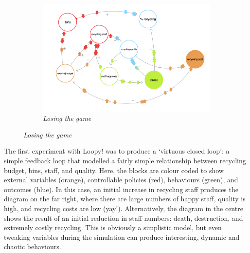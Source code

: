 \documentclass[nofonts,nols,justified,nobib]{tufte-book}
\begin{document}
\begin{figure}
\begin{subfigure}{.3\textwidth}
  \centering
  \includegraphics[width=1\linewidth]{img/3/loopy/small-lose.png}
  \caption{\textit{Losing the game}}
  \label{small:lose}
\end{subfigure}%
\end{figure}
\vspace{0.8cm}

The first experiment with Loopy! was to produce a `virtuous closed loop': a simple feedback loop that modelled a fairly simple relationship between recycling budget, bins, staff, and quality. Here, the blocks are colour coded to show external variables (orange), controllable policies (red), behaviours (green), and outcomes (blue). In this case, an initial increase in recycling staff produces the diagram on the far right, where there are large numbers of happy staff, quality is high, and recycling costs are low (yay!). Alternatively, the diagram in the centre shows the result of an initial reduction in staff numbers: death, destruction, and extremely costly recycling. This is obviously a simplistic model, but even tweaking variables during the simulation can produce interesting, dynamic and chaotic behaviours.
\end{document}
